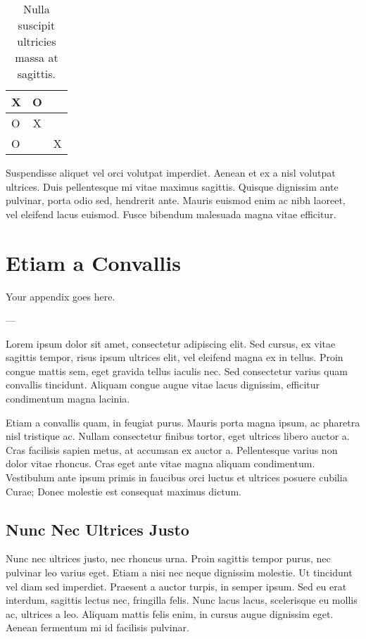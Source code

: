 \documentclass[dissertation]{msudissertation}
\begin{document}
\begin{landscape}
\begin{table}
  \centering
  \begin{tabular}{l | c | r}
    X & O &   \\ \hline
    O & X &   \\ \hline
    O &   & X \\
  \end{tabular}
  \caption{Nulla suscipit ultricies massa at sagittis.}
\end{table}

Suspendisse aliquet vel orci volutpat imperdiet. Aenean et ex a nisl volutpat ultrices. Duis pellentesque mi vitae maximus sagittis. Quisque dignissim ante pulvinar, porta odio sed, hendrerit ante. Mauris euismod enim ac nibh laoreet, vel eleifend lacus euismod. Fusce bibendum malesuada magna vitae efficitur.
\end{landscape}

\appendix

\chapter{Etiam a Convallis}

Your appendix goes here.

---

Lorem ipsum dolor sit amet, consectetur adipiscing elit. Sed cursus, ex vitae sagittis tempor, risus ipsum ultrices elit, vel eleifend magna ex in tellus. Proin congue mattis sem, eget gravida tellus iaculis nec. Sed consectetur varius quam convallis tincidunt. Aliquam congue augue vitae lacus dignissim, efficitur condimentum magna lacinia.

Etiam a convallis quam, in feugiat purus. Mauris porta magna ipsum, ac pharetra nisl tristique ac. Nullam consectetur finibus tortor, eget ultrices libero auctor a. Cras facilisis sapien metus, at accumsan ex auctor a. Pellentesque varius non dolor vitae rhoncus. Cras eget ante vitae magna aliquam condimentum. Vestibulum ante ipsum primis in faucibus orci luctus et ultrices posuere cubilia Curae; Donec molestie est consequat maximus dictum.\cite{exampleref2}

\section{Nunc Nec Ultrices Justo}

Nunc nec ultrices justo, nec rhoncus urna. Proin sagittis tempor purus, nec pulvinar leo varius eget. Etiam a nisi nec neque dignissim molestie. Ut tincidunt vel diam sed imperdiet. Praesent a auctor turpis, in semper ipsum. Sed eu erat interdum, sagittis lectus nec, fringilla felis. Nunc lacus lacus, scelerisque eu mollis ac, ultrices a leo. Aliquam mattis felis enim, in cursus augue dignissim eget. Aenean fermentum mi id facilisis pulvinar.\cite{exampleref1}
\end{document}
